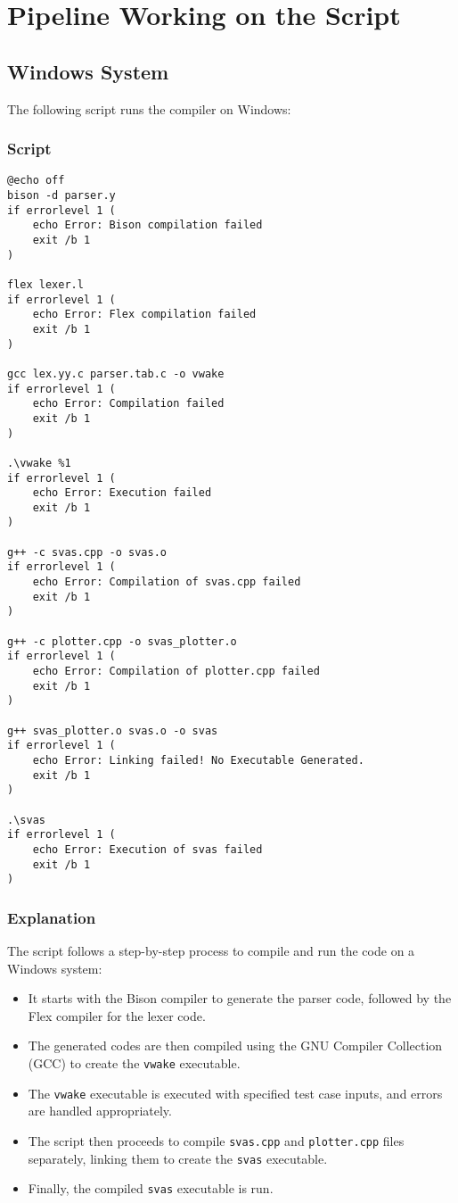 \documentclass{article}
\begin{document}
\section{Pipeline Working on the Script}

\subsection{Windows System}

The following script runs the compiler on Windows:

\subsubsection{Script}
\begin{lstlisting}
@echo off
bison -d parser.y
if errorlevel 1 (
    echo Error: Bison compilation failed
    exit /b 1
)

flex lexer.l
if errorlevel 1 (
    echo Error: Flex compilation failed
    exit /b 1
)

gcc lex.yy.c parser.tab.c -o vwake
if errorlevel 1 (
    echo Error: Compilation failed
    exit /b 1
)

.\vwake %1
if errorlevel 1 (
    echo Error: Execution failed
    exit /b 1
)

g++ -c svas.cpp -o svas.o
if errorlevel 1 (
    echo Error: Compilation of svas.cpp failed
    exit /b 1
)

g++ -c plotter.cpp -o svas_plotter.o
if errorlevel 1 (
    echo Error: Compilation of plotter.cpp failed
    exit /b 1
)

g++ svas_plotter.o svas.o -o svas
if errorlevel 1 (
    echo Error: Linking failed! No Executable Generated.
    exit /b 1
)

.\svas
if errorlevel 1 (
    echo Error: Execution of svas failed
    exit /b 1
)
\end{lstlisting}

\subsubsection{Explanation}
The script follows a step-by-step process to compile and run the code on a Windows system:
\begin{itemize}
    \item It starts with the Bison compiler to generate the parser code, followed by the Flex compiler for the lexer code.
    \item The generated codes are then compiled using the GNU Compiler Collection (GCC) to create the \texttt{vwake} executable.
    \item The \texttt{vwake} executable is executed with specified test case inputs, and errors are handled appropriately.
    \item The script then proceeds to compile \texttt{svas.cpp} and \texttt{plotter.cpp} files separately, linking them to create the \texttt{svas} executable.
    \item Finally, the compiled \texttt{svas} executable is run.
\end{itemize}
\end{document}

